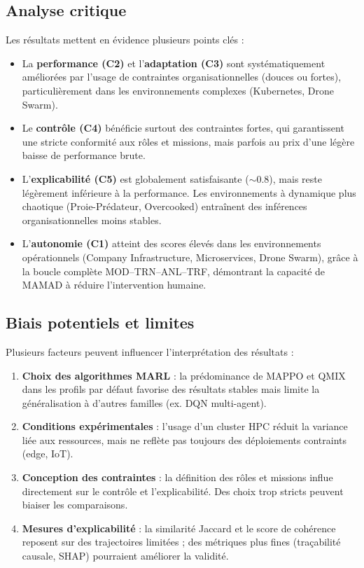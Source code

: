 \subsection{Analyse critique}

Les résultats mettent en évidence plusieurs points clés :
\begin{itemize}
  \item La \textbf{performance (C2)} et l’\textbf{adaptation (C3)} sont systématiquement améliorées par l’usage de contraintes organisationnelles (douces ou fortes), particulièrement dans les environnements complexes (Kubernetes, Drone Swarm).
  \item Le \textbf{contrôle (C4)} bénéficie surtout des contraintes fortes, qui garantissent une stricte conformité aux rôles et missions, mais parfois au prix d’une légère baisse de performance brute.
  \item L’\textbf{explicabilité (C5)} est globalement satisfaisante ($\sim 0.8$), mais reste légèrement inférieure à la performance. Les environnements à dynamique plus chaotique (Proie-Prédateur, Overcooked) entraînent des inférences organisationnelles moins stables.
  \item L’\textbf{autonomie (C1)} atteint des scores élevés dans les environnements opérationnels (Company Infrastructure, Microservices, Drone Swarm), grâce à la boucle complète MOD–TRN–ANL–TRF, démontrant la capacité de MAMAD à réduire l’intervention humaine.
\end{itemize}

\subsection{Biais potentiels et limites}

Plusieurs facteurs peuvent influencer l’interprétation des résultats :
\begin{enumerate}[label={\alph*)}]
  \item \textbf{Choix des algorithmes MARL} : la prédominance de MAPPO et QMIX dans les profils par défaut favorise des résultats stables mais limite la généralisation à d’autres familles (ex. DQN multi-agent).
  \item \textbf{Conditions expérimentales} : l’usage d’un cluster HPC réduit la variance liée aux ressources, mais ne reflète pas toujours des déploiements contraints (edge, IoT).
  \item \textbf{Conception des contraintes} : la définition des rôles et missions influe directement sur le contrôle et l’explicabilité. Des choix trop stricts peuvent biaiser les comparaisons.
  \item \textbf{Mesures d’explicabilité} : la similarité Jaccard et le score de cohérence reposent sur des trajectoires limitées ; des métriques plus fines (traçabilité causale, SHAP) pourraient améliorer la validité.
\end{enumerate}

